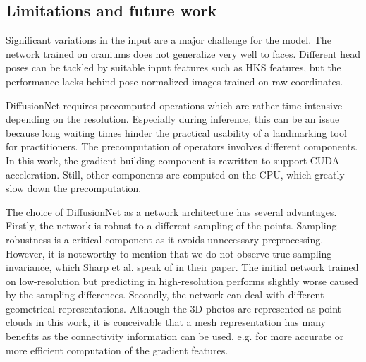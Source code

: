 \documentclass[class=article, crop=false]{standalone}
\begin{document}


\label{sec:discussion}
\subsection{Limitations and future work}
Significant variations in the input are a major challenge for the model. The network trained on craniums does not generalize very well to faces. Different head poses can be tackled by suitable input features such as HKS features, but the performance lacks behind pose normalized images trained on raw coordinates. 

DiffusionNet requires precomputed operations which are rather time-intensive depending on the resolution. Especially during inference, this can be an issue because long waiting times hinder the practical usability of a landmarking tool for practitioners. The precomputation of operators involves different components. In this work, the gradient building component is rewritten to support CUDA-acceleration. Still, other components are computed on the CPU, which greatly slow down the precomputation.

The choice of DiffusionNet as a network architecture has several advantages. Firstly, the network is robust to a different sampling of the points. Sampling robustness is a critical component as it avoids unnecessary preprocessing. However, it is noteworthy to mention that we do not observe true sampling invariance, which Sharp et al. speak of in their paper. The initial network trained on low-resolution but predicting in high-resolution performs slightly worse caused by the sampling differences. Secondly, the network can deal with different geometrical representations. Although the 3D photos are represented as point clouds in this work, it is conceivable that a mesh representation has many benefits as the connectivity information can be used, e.g. for more accurate or more efficient computation of the gradient features.
\end{document}
